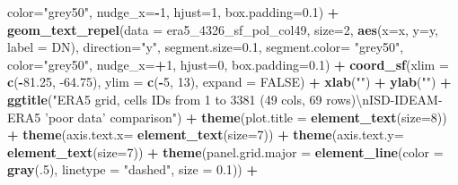 \documentclass[12pt,twoside]{reedthesis}
\newenvironment{Shaded}{\begin{snugshade}}{\end{snugshade}}
\newcommand{\CharTok}[1]{\textcolor[rgb]{0.31,0.60,0.02}{#1}}
\newcommand{\DataTypeTok}[1]{\textcolor[rgb]{0.13,0.29,0.53}{#1}}
\newcommand{\DecValTok}[1]{\textcolor[rgb]{0.00,0.00,0.81}{#1}}
\newcommand{\FloatTok}[1]{\textcolor[rgb]{0.00,0.00,0.81}{#1}}
\newcommand{\KeywordTok}[1]{\textcolor[rgb]{0.13,0.29,0.53}{\textbf{#1}}}
\newcommand{\NormalTok}[1]{#1}
\newcommand{\OperatorTok}[1]{\textcolor[rgb]{0.81,0.36,0.00}{\textbf{#1}}}
\newcommand{\OtherTok}[1]{\textcolor[rgb]{0.56,0.35,0.01}{#1}}
\newcommand{\StringTok}[1]{\textcolor[rgb]{0.31,0.60,0.02}{#1}}
\begin{document}
\begin{Shaded}
\begin{Highlighting}[]
{{{{   \DataTypeTok{color=}\StringTok{"grey50"}\NormalTok{, }\DataTypeTok{nudge_x=}\OperatorTok{-}\DecValTok{1}\NormalTok{, }\DataTypeTok{hjust=}\DecValTok{1}\NormalTok{, }\DataTypeTok{box.padding=}\FloatTok{0.1}\NormalTok{) }\OperatorTok{+}
\StringTok{  }\KeywordTok{geom_text_repel}\NormalTok{(}\DataTypeTok{data =}\NormalTok{ era5_}\DecValTok{4326}\NormalTok{_sf_pol_col49, }\DataTypeTok{size=}\DecValTok{2}\NormalTok{, }\KeywordTok{aes}\NormalTok{(}\DataTypeTok{x=}\NormalTok{x, }\DataTypeTok{y=}\NormalTok{y, }\DataTypeTok{label =}\NormalTok{ DN), }\DataTypeTok{direction=}\StringTok{"y"}\NormalTok{, }\DataTypeTok{segment.size=}\FloatTok{0.1}\NormalTok{, }\DataTypeTok{segment.color=} \StringTok{"grey50"}\NormalTok{, }
   \DataTypeTok{color=}\StringTok{"grey50"}\NormalTok{, }\DataTypeTok{nudge_x=}\OperatorTok{+}\DecValTok{1}\NormalTok{, }\DataTypeTok{hjust=}\DecValTok{0}\NormalTok{, }\DataTypeTok{box.padding=}\FloatTok{0.1}\NormalTok{) }\OperatorTok{+}
\StringTok{  }\KeywordTok{coord_sf}\NormalTok{(}\DataTypeTok{xlim =} \KeywordTok{c}\NormalTok{(}\OperatorTok{-}\FloatTok{81.25}\NormalTok{, }\FloatTok{-64.75}\NormalTok{), }\DataTypeTok{ylim =} \KeywordTok{c}\NormalTok{(}\OperatorTok{-}\DecValTok{5}\NormalTok{, }\DecValTok{13}\NormalTok{), }\DataTypeTok{expand =} \OtherTok{FALSE}\NormalTok{) }\OperatorTok{+}
\StringTok{  }\KeywordTok{xlab}\NormalTok{(}\StringTok{""}\NormalTok{) }\OperatorTok{+}\StringTok{ }
\StringTok{  }\KeywordTok{ylab}\NormalTok{(}\StringTok{""}\NormalTok{) }\OperatorTok{+}\StringTok{ }
\StringTok{  }\KeywordTok{ggtitle}\NormalTok{(}\StringTok{"ERA5 grid, cells IDs from 1 to 3381 (49 cols, 69 rows)}\CharTok{\textbackslash{}n}\StringTok{ISD-IDEAM-ERA5 'poor data' comparison"}\NormalTok{) }\OperatorTok{+}\StringTok{ }
\StringTok{  }\KeywordTok{theme}\NormalTok{(}\DataTypeTok{plot.title =} \KeywordTok{element_text}\NormalTok{(}\DataTypeTok{size=}\DecValTok{8}\NormalTok{)) }\OperatorTok{+}
\StringTok{  }\KeywordTok{theme}\NormalTok{(}\DataTypeTok{axis.text.x=} \KeywordTok{element_text}\NormalTok{(}\DataTypeTok{size=}\DecValTok{7}\NormalTok{)) }\OperatorTok{+}\StringTok{ }
\StringTok{  }\KeywordTok{theme}\NormalTok{(}\DataTypeTok{axis.text.y=} \KeywordTok{element_text}\NormalTok{(}\DataTypeTok{size=}\DecValTok{7}\NormalTok{)) }\OperatorTok{+}
\StringTok{  }\KeywordTok{theme}\NormalTok{(}\DataTypeTok{panel.grid.major =} \KeywordTok{element_line}\NormalTok{(}\DataTypeTok{color =} \KeywordTok{gray}\NormalTok{(.}\DecValTok{5}\NormalTok{), }\DataTypeTok{linetype =} \StringTok{"dashed"}\NormalTok{, }\DataTypeTok{size =} \FloatTok{0.1}\NormalTok{)) }\OperatorTok{+}
}}}}
\end{Highlighting}
\end{Shaded}
\end{document}
